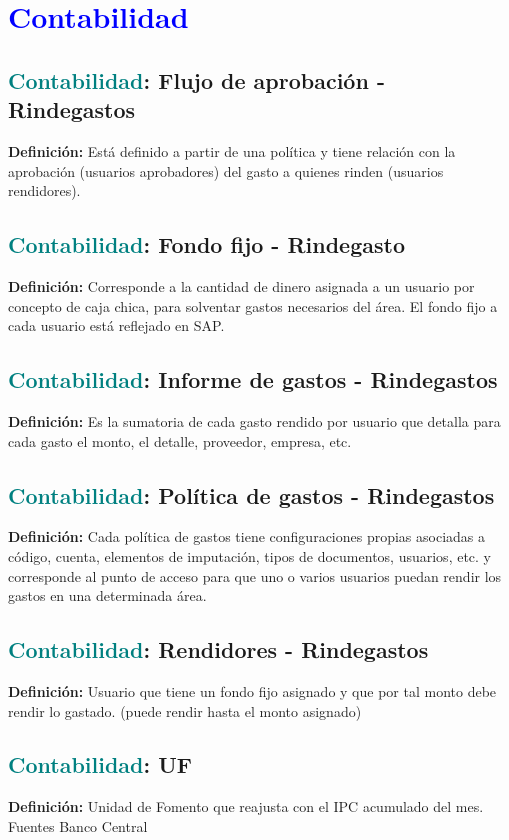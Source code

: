 \documentclass[12pt]{article}
\begin{document}
\section{\textcolor{blue}{Contabilidad}}
\subsection{\textcolor{teal}{Contabilidad}: Flujo de aprobación - Rindegastos}
\textbf{Definición:} Está definido a partir de una política y tiene relación con la aprobación (usuarios aprobadores) del gasto a quienes rinden (usuarios rendidores).
\subsection{\textcolor{teal}{Contabilidad}: Fondo fijo - Rindegasto}
\textbf{Definición:} Corresponde a la cantidad de dinero asignada a un usuario por concepto de caja chica, para solventar gastos necesarios del área. El fondo fijo a cada usuario está reflejado en SAP.
\subsection{\textcolor{teal}{Contabilidad}: Informe de gastos - Rindegastos}
\textbf{Definición:} Es la sumatoria de cada gasto rendido por usuario que detalla para cada gasto el monto, el detalle, proveedor, empresa, etc.
\subsection{\textcolor{teal}{Contabilidad}: Política de gastos - Rindegastos}
\textbf{Definición:} Cada política de gastos tiene configuraciones propias asociadas a código, cuenta, elementos de imputación, tipos de documentos, usuarios, etc. y corresponde al punto de acceso para que uno o varios usuarios puedan rendir los gastos en una determinada área.
\subsection{\textcolor{teal}{Contabilidad}: Rendidores - Rindegastos}
\textbf{Definición:} Usuario que tiene un fondo fijo asignado y que por tal monto debe rendir lo gastado. (puede rendir hasta el monto asignado)
\subsection{\textcolor{teal}{Contabilidad}: UF}
\textbf{Definición:} Unidad de Fomento que reajusta con el IPC acumulado del mes. Fuentes Banco Central
\end{document}
